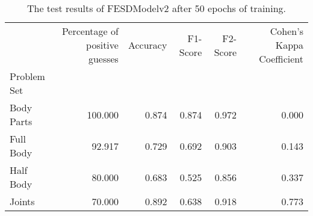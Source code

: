 \begin{table}
      \caption[]{}
      \label{}
          \begin{table}[!htbp]
        \caption[Test Results of FESDModelv2]{The test results of FESDModelv2 after 50 epochs of training.}
        \label{tab:res_v2}
        \begin{tabular}{lrrrrr}
\hline
{} &  Percentage of positive guesses &  Accuracy &  F1-Score &  F2-Score &  Cohen's Kappa Coefficient \\
Problem Set   &                                 &           &           &           &                            \\
\hline
Body Parts &                         100.000 &     0.874 &     0.874 &     0.972 &                      0.000 \\
Full Body  &                          92.917 &     0.729 &     0.692 &     0.903 &                      0.143 \\
Half Body  &                          80.000 &     0.683 &     0.525 &     0.856 &                      0.337 \\
Joints     &                          70.000 &     0.892 &     0.638 &     0.918 &                      0.773 \\
\hline
\end{tabular}

    \end{table}
  \end{table}